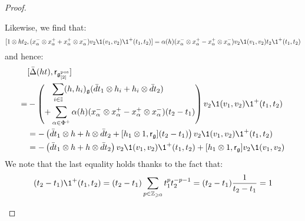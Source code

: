 \begin{proof}
\begin{enumerate}
\begin{enumerate}
                        Likewise, we find that:
                            $$[1 \tensor h t_2, (x_{\alpha}^- \tensor x_{\alpha}^+ + x_{\alpha}^+ \tensor x_{\alpha}^-) v_2\1(v_1, v_2) \1^+(t_1, t_2)] = \alpha(h) ( x_{\alpha}^- \tensor x_{\alpha}^+ - x_{\alpha}^+ \tensor x_{\alpha}^- ) v_2 \1(v_1, v_2) t_2 \1^+(t_1, t_2)$$
                        and hence:
                            $$
                                \begin{aligned}
                                    & [\bar{\Delta}(ht), \sfr_{\g_{[2]}^{\positive}}]
                                    \\
                                    = &
                                    -\left(
                                    \begin{aligned}
                                        & \sum_{i \in \simpleroots} (h, h_i)_{\g} ( \bar{d}t_1 \tensor h_i + h_i \tensor \bar{d}t_2 )
                                        \\
                                        + & \sum_{\alpha \in \Phi^+} \alpha(h) ( x_{\alpha}^- \tensor x_{\alpha}^+ - x_{\alpha}^+ \tensor x_{\alpha}^- )(t_2 - t_1)
                                    \end{aligned}
                                    \right) v_2 \1(v_1, v_2) \1^+(t_1, t_2)
                                    \\
                                    & = -\left( \bar{d}t_1 \tensor h + h \tensor \bar{d}t_2 + [h_1 \tensor 1, \sfr_{\g}] (t_2 - t_1) \right) v_2 \1(v_1, v_2) \1^+(t_1, t_2)
                                    \\
                                    & = -\left( \bar{d}t_1 \tensor h + h \tensor \bar{d}t_2 \right) v_2 \1(v_1, v_2) \1^+(t_1, t_2) + [h_1 \tensor 1, \sfr_{\g}] v_2 \1(v_1, v_2)
                                \end{aligned}
                            $$
                        We note that the last equality holds thanks to the fact that:
                            $$(t_2 - t_1) \1^+(t_1, t_2) = (t_2 - t_1) \sum_{p \in \Z_{\geq 0}} t_1^p t_2^{-p - 1} = (t_2 - t_1) \frac{1}{t_2 - t_1} = 1$$
                            

\end{enumerate}
\end{enumerate}
\end{proof}
